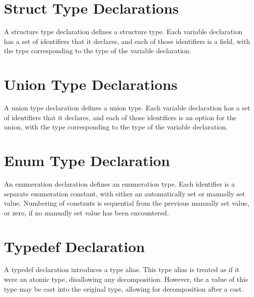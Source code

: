 \documentclass[letterpaper,12pt]{book}
\begin{document}
\section{Struct Type Declarations}



A structure type declaration defines a structure type. Each variable declaration has a set of identifiers that it declares, and each of those identifiers is a field, with the type corresponding to the type of the variable declaration.

\section{Union Type Declarations}



A union type declaration defines a union type. Each variable declaration has a set of identifiers that it declares, and each of those identifiers is an option for the union, with the type corresponding to the type of the variable declaration.

\section{Enum Type Declaration}



An enumeration declaration defines an enumeration type. Each identifier is a separate enumeration constant, with either an automatically set or manually set value. Numbering of constants is sequential from the previous manually set value, or zero, if no manually set value has been encountered.

\section{Typedef Declaration}



A typedef declaration introduces a type alias. This type alias is treated as if it were an atomic type, disallowing any decomposition. However, the a value of this type may be cast into the original type, allowing for decomposition after a cast.
\end{document}

